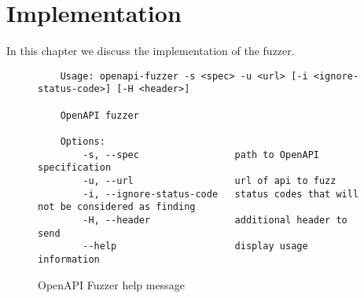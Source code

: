 \chapter{Implementation}
In this chapter we discuss the implementation of the fuzzer.

\begin{figure}
    \begin{verbatim}
    Usage: openapi-fuzzer -s <spec> -u <url> [-i <ignore-status-code>] [-H <header>]

    OpenAPI fuzzer

    Options:
        -s, --spec                 path to OpenAPI specification
        -u, --url                  url of api to fuzz
        -i, --ignore-status-code   status codes that will not be considered as finding
        -H, --header               additional header to send
        --help                     display usage information
\end{verbatim}
\caption{OpenAPI Fuzzer help message}
\label{fig:openapi-help}
\end{figure}
